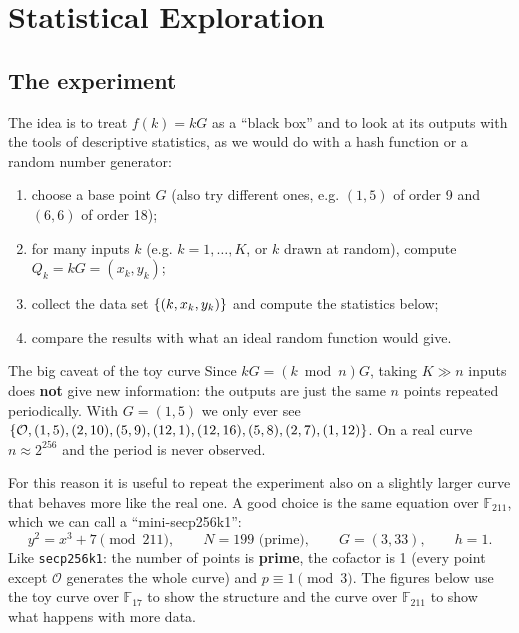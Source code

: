 \section{Statistical Exploration}
\label{sec:stats}


\subsection{The experiment}

The idea is to treat $f(k) = kG$ as a ``black box'' and to look at its outputs with the tools of descriptive statistics, as we would do with a hash function or a random number generator:
\begin{enumerate}
  \item choose a base point $G$ (also try different ones, e.g. $(1,5)$ of order 9 and $(6,6)$ of order 18);
  \item for many inputs $k$ (e.g. $k = 1, \ldots, K$, or $k$ drawn at random), compute $Q_k = kG = (x_k, y_k)$;
  \item collect the data set $\left\{(k, x_k, y_k)\right\}$ and compute the statistics below;
  \item compare the results with what an ideal random function would give.
\end{enumerate}

\begin{framedobs}{The big caveat of the toy curve}
  Since $kG = (k \bmod n) G$, taking $K \gg n$ inputs does \textbf{not} give new information: the outputs are just the same $n$ points repeated periodically. With $G = (1,5)$ we only ever see $\left\{\mathcal{O}, (1,5), (2,10), (5,9), (12,1), (12,16), (5,8), (2,7), (1,12)\right\}$. On a real curve $n \approx 2^{256}$ and the period is never observed.
\end{framedobs}

For this reason it is useful to repeat the experiment also on a slightly larger curve that behaves more like the real one. A good choice is the same equation over $\mathbb{F}_{211}$, which we can call a ``mini-secp256k1'':
\[
  y^2 = x^3 + 7 \pmod{211}, \qquad N = 199 \text{ (prime)}, \qquad G = (3, 33), \qquad h = 1 .
\]
Like \texttt{secp256k1}: the number of points is \textbf{prime}, the cofactor is 1 (every point except $\mathcal{O}$ generates the whole curve) and $p \equiv 1 \pmod 3$. The figures below use the toy curve over $\mathbb{F}_{17}$ to show the structure and the curve over $\mathbb{F}_{211}$ to show what happens with more data.

